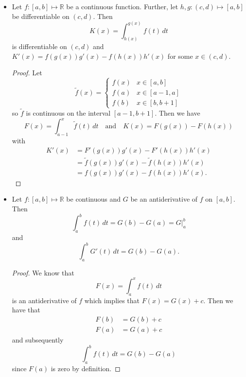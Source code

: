 \documentclass{article}
\newcommand{\R}{\mathbb{R}}
\newcommand{\?}{\stackrel{?}{=}}
\theoremstyle{definition} %
\begin{document}
\begin{itemize}
\begin{proof}
        Take $x \in [a, b]$. By the IMVT, there exists some $c(x) \in [a, x]$ such that $f(c(x))(x - a) = \int_a^x f(t) \,dt = F(x)$ and
        $$\lim_{x \to a^+} f(x) = \lim_{x \to a^+} f(c(x))(c - a) = 0 = F(a).$$
        The argument is identical for $F(b) = f(b)$.
    \end{proof}
    \item[]
    \begin{lemma}
        Let $f: [a, b] \mapsto \R$ be a continuous function. Further, let $h, g: (c, d) \mapsto [a, b]$ be differentiable on $(c, d)$. Then
        $$K(x) = \int_{h(x)}^{g(x)} f(t) \,dt$$
        is differentiable on $(c, d)$ and $K'(x) = f(g(x))g'(x) - f(h(x))h'(x)$ for some $x \in (c, d)$.
    \end{lemma}
    \begin{proof}
        Let
        \[
        \widetilde{f}(x) =
        \begin{cases}
            f(x) & x \in [a, b] \\
            f(a) & x \in [a - 1, a] \\
            f(b) & x \in [b, b + 1]
        \end{cases}
        \]
        so $\widetilde{f}$ is continuous on the interval $[a - 1, b + 1]$. Then we have
        $$F(x) = \int_{a - 1}^x \widetilde{f}(t) \,dt \quad \text{and} \quad K(x) = F(g(x)) - F(h(x))$$
        with
        \begin{align*}
            K'(x) &= F'(g(x))g'(x) - F'(h(x))h'(x) \\
            &= \widetilde{f}(g(x))g'(x) - \widetilde{f}(h(x))h'(x) \\
            &= f(g(x))g'(x) - f(h(x))h'(x).
        \end{align*}
    \end{proof}
    \item[]
    \begin{theorem}
        Let $f: [a, b] \mapsto \R$ be continuous and $G$ be an antiderivative of $f$ on $[a, b]$. Then
        $$\int_a^b f(t) \,dt = G(b) - G(a) = G \bigg|_a^b$$
        and
        $$\int_a^b G'(t) \,dt = G(b) - G(a).$$
        \label{thm:ftc}
    \end{theorem}
    \begin{proof}
        We know that
        $$F(x) = \int_a^x f(t) \,dt$$
        is an antiderivative of $f$ which implies that $F(x) = G(x) + c$. Then we have that
        \begin{align*}
            F(b) &= G(b) + c \\
            F(a) &= G(a) + c
        \end{align*}
        and subsequently
        $$\int_a^b f(t) \,dt = G(b) - G(a)$$
        since $F(a)$ is zero by definition.
    \end{proof}
\end{itemize}
\end{document}
